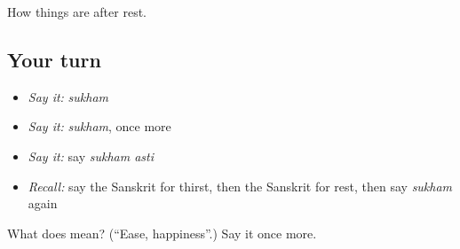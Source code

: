 \begin{grammarlens}[title={What you've built}]
How things are after rest.
\end{grammarlens}

\subsection*{Your turn}
\begin{itemize}
\raggedright
  \item \emph{Say it:} \emph{sukham}
  \item \emph{Say it:} \emph{sukham}, once more
  \item \emph{Say it:} say \emph{sukham asti}
  \item \emph{Recall:} say the Sanskrit for thirst, then the Sanskrit for rest, then say \emph{sukham} again
\end{itemize}

\begin{tcolorbox}[breakable,colback=teal!4,colframe=teal!35!black,title={Before you move on}]
What does  mean? (\textquotedblleft{}Ease, happiness\textquotedblright{}.) Say it once more.
\end{tcolorbox}
